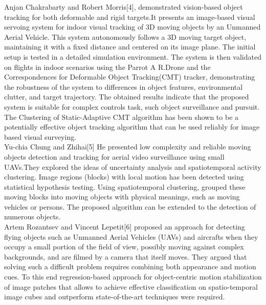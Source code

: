 \documentclass[12pt,a4paper]{report}
\begin{document}
\hspace*{1cm}
Anjan Chakrabarty and Robert Morris[4], demonstrated vision-based object tracking for both deformable and rigid targets.It presents an image-based visual servoing system for indoor visual tracking of 3D moving objects
by an Unmanned Aerial Vehicle. This system autonomously
follows a 3D moving target object, maintaining it with a fixed
distance and centered on its image plane. The initial setup
is tested in a detailed simulation environment. The system is
then validated on flights in indoor scenarios using the Parrot
A R.Drone and the Correspondences for Deformable Object
Tracking(CMT) tracker, demonstrating the robustness
of the system to differences in object features, environmental
clutter, and target trajectory. The obtained results indicate that
the proposed system is suitable for complex controls task, such
object surveillance and pursuit. The Clustering
of Static-Adaptive CMT algorithm has been shown to be a potentially effective object tracking algorithm that can be used
reliably for image based visual surveying.\\


\hspace*{1cm}
Yu-chia Chung and Zhihai[5] He presented low complexity and reliable moving objects detection and tracking for aerial video surveillance using small UAVs.They explored the ideas of uncertainty analysis and spatiotemporal activity clustering. Image regions
(blocks) with local motion has been detected using statistical
hypothesis testing. Using spatiotemporal clustering,
grouped these moving blocks into moving objects with physical meanings, such as moving vehicles or persons. The proposed algorithm can be extended to the detection of numerous objects.\\

\hspace*{1cm}
Artem Rozantsev and Vincent Lepetit[6] proposed an approach for detecting flying objects such as Unmanned Aerial Vehicles (UAVs) and aircrafts when they
occupy a small portion of the field of view, possibly moving against complex backgrounds, and are filmed by a camera that itself moves.
They argued that solving such a difficult problem requires combining both appearance and motion cues. To this end 
regression-based approach for object-centric motion stabilization of image patches that allows to achieve effective classification on
spatio-temporal image cubes and outperform state-of-the-art techniques were required.
\\
\end{document}
